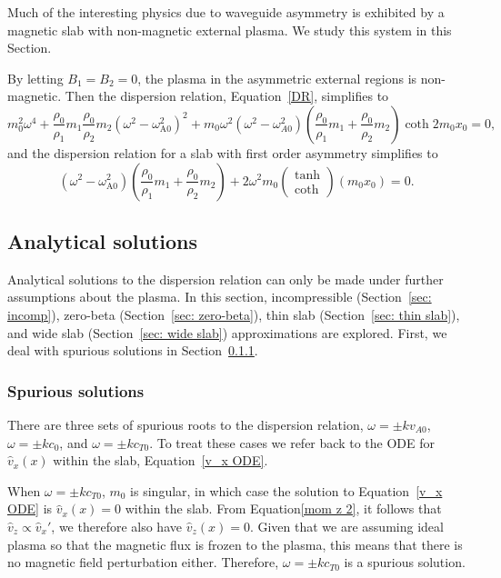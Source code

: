 \documentclass[12pt]{../style-files/ociamthesis}
\begin{document}
Much of the interesting physics due to waveguide asymmetry is exhibited by a magnetic slab with non-magnetic external plasma. We study this system in this Section.

By letting $B_1 = B_2 = 0$, the plasma in the asymmetric external regions is non-magnetic. Then the dispersion relation, Equation~\eqref{DR}, simplifies to
\begin{equation}
m_0^2\omega^4 + \frac{\rho_0}{\rho_1}m_1\frac{\rho_0}{\rho_2}m_2(\omega^2 - \omega_\textrm{A0}^2)^2 + m_0\omega^2(\omega^2 - \omega_{A0}^2)\left(\frac{\rho_0}{\rho_1}m_1 + \frac{\rho_0}{\rho_2}m_2\right)\coth{2m_0x_0} = 0, \label{DR non-mag}
\end{equation}
and the dispersion relation for a slab with first order asymmetry simplifies to
\begin{equation}
(\omega^2 - \omega_\textrm{A0}^2)\left(\frac{\rho_0}{\rho_1}m_1 + \frac{\rho_0}{\rho_2}m_2\right)  +  2\omega^2m_0\left(\begin{matrix}\tanh \\ \coth \end{matrix}\right)(m_0x_0) = 0. \label{DR approx non-mag}
\end{equation}


\subsection{Analytical solutions}
Analytical solutions to the dispersion relation can only be made under further assumptions about the plasma. In this section, incompressible (Section~\ref{sec: incomp}), zero-beta (Section~\ref{sec: zero-beta}), thin slab (Section~\ref{sec: thin slab}), and wide slab (Section~\ref{sec: wide slab}) approximations are explored. First, we deal with spurious solutions in Section~\ref{sec: spurious}.

\subsubsection{Spurious solutions} \label{sec: spurious}
There are three sets of spurious roots to the dispersion relation, $\omega = \pm kv_{A0}$, $\omega = \pm kc_0$, and $\omega = \pm kc_{T0}$. To treat these cases we refer back to the ODE for $\hat{v}_x(x)$ within the slab, Equation~\eqref{v_x ODE}.

When $\omega = \pm kc_{T0}$, $m_0$ is singular, in which case the solution to Equation~\eqref{v_x ODE} is $\hat{v}_x(x) = 0$ within the slab. From Equation\eqref{mom z 2}, it follows that $\hat{v}_z \propto \hat{v}_x'$, we therefore also have $\hat{v}_z(x) = 0$. Given that we are assuming ideal plasma so that the magnetic flux is frozen to the plasma, this means that there is no magnetic field perturbation either. Therefore, $\omega = \pm kc_{T0}$ is a spurious solution.
\end{document}
